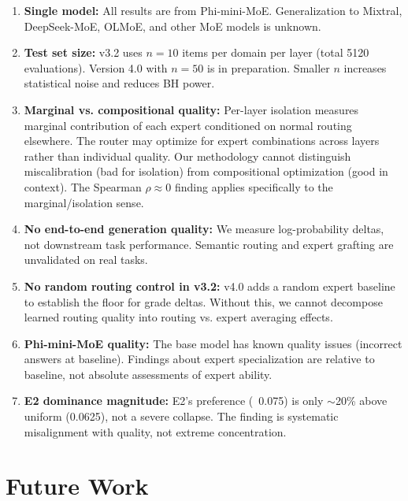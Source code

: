 \documentclass[11pt,a4paper]{article}
\begin{document}
\begin{enumerate}
\item \textbf{Single model:} All results are from Phi-mini-MoE. Generalization to Mixtral, DeepSeek-MoE, OLMoE, and other MoE models is unknown.

\item \textbf{Test set size:} v3.2 uses $n=10$ items per domain per layer (total 5120 evaluations). Version 4.0 with $n=50$ is in preparation. Smaller $n$ increases statistical noise and reduces BH power.

\item \textbf{Marginal vs. compositional quality:} Per-layer isolation measures marginal contribution of each expert conditioned on normal routing elsewhere. The router may optimize for expert combinations across layers rather than individual quality. Our methodology cannot distinguish miscalibration (bad for isolation) from compositional optimization (good in context). The Spearman $\rho \approx 0$ finding applies specifically to the marginal/isolation sense.

\item \textbf{No end-to-end generation quality:} We measure log-probability deltas, not downstream task performance. Semantic routing and expert grafting are unvalidated on real tasks.

\item \textbf{No random routing control in v3.2:} v4.0 adds a random expert baseline to establish the floor for grade deltas. Without this, we cannot decompose learned routing quality into routing vs. expert averaging effects.

\item \textbf{Phi-mini-MoE quality:} The base model has known quality issues (incorrect answers at baseline). Findings about expert specialization are relative to baseline, not absolute assessments of expert ability.

\item \textbf{E2 dominance magnitude:} E2's preference (~0.075) is only $\sim$20\% above uniform (0.0625), not a severe collapse. The finding is systematic misalignment with quality, not extreme concentration.
\end{enumerate}

\section{Future Work}
\end{document}
